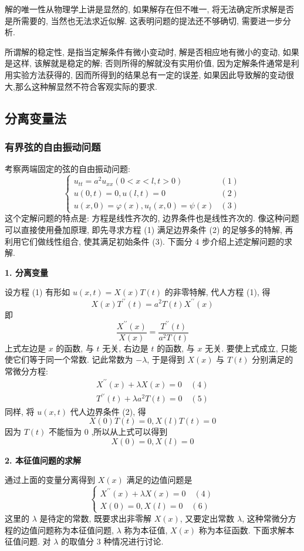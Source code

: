 解的唯一性从物理学上讲是显然的, 如果解存在但不唯一, 将无法确定所求解是否是所需要的, 当然也无法求近似解. 这表明问题的提法还不够确切, 需要进一步分析.

所谓解的稳定性, 是指当定解条件有微小变动时, 解是否相应地有微小的变动, 如果是这样, 该解就是稳定的解; 否则所得的解就没有实用价值, 因为定解条件通常是利用实验方法获得的, 因而所得到的结果总有一定的误差, 如果因此导致解的变动很大,那么这种解显然不符合客观实际的要求.

\subsection{分离变量法}
\subsubsection{有界弦的自由振动问题}
考察两端固定的弦的自由振动问题:
$$
\left.\left\{\begin{array}{ll}u_{tt}=a^2u_{xx}(0<x<l,t>0)&(1)\\u(0,t)=0,u(l,t)=0&(2)\\u(x,0)=\varphi(x),u_t(x,0)=\psi(x)&(3)\end{array}\right.\right.
$$
这个定解问题的特点是: 方程是线性齐次的, 边界条件也是线性齐次的. 像这种问题可以直接使用叠加原理, 即先寻求方程 (1) 满足边界条件 (2) 的足够多的特解, 再利用它们做线性组合, 使其满足初始条件 (3). 下面分 4 步介绍上述定解问题的求解.

\textbf{1. 分离变量}

设方程 (1) 有形如 $ u(x, t)=X(x) T(t) $ 的非零特解, 代人方程 (1), 得
$$
X(x) T^{\prime \prime}(t)=a^{2} T(t) X^{\prime \prime}(x)
$$
即
$$
\frac{X^{\prime \prime}(x)}{X(x)}=\frac{T^{\prime \prime}(t)}{a^{2} T(t)}
$$
上式左边是 $ x $ 的函数, 与 $ t $ 无关, 右边是 $ t $ 的函数, 与 $ x $ 无关. 要使上式成立, 只能使它们等于同一个常数. 记此常数为 $ -\lambda $, 于是得到 $ X(x) $ 与 $ T(t) $ 分别满足的常微分方程:
$$
\begin{array}{c}
X^{\prime \prime}(x)+\lambda X(x)=0 \quad(4)\\
T^{\prime \prime}(t)+\lambda a^{2} T(t)=0\quad(5)
\end{array}
$$
同样, 将 $ u(x, t) $ 代人边界条件 (2), 得
$$
X(0) T(t)=0, X(l) T(t)=0
$$
因为 $ T(t) $ 不能恒为 0 ,所以从上式可以得到
$$
X(0)=0, X(l)=0
$$

\textbf{2. 本征值问题的求解}

通过上面的变量分离得到 $ X(x) $ 满足的边值问题是
$$
\left\{\begin{array}{l}
X^{\prime \prime}(x)+\lambda X(x)=0 \quad(4)\\
X(0)=0, X(l)=0\quad(6)
\end{array}\right.
$$
这里的 $ \lambda $ 是待定的常数, 既要求出非零解 $ X(x) $, 又要定出常数 $ \lambda $, 这种常微分方程的边值问题称为本征值问题, $ \lambda $ 称为本征值, $ X(x) $ 称为本征函数. 下面求解本征值问题. 对 $ \lambda $ 的取值分 3 种情况进行讨论.

